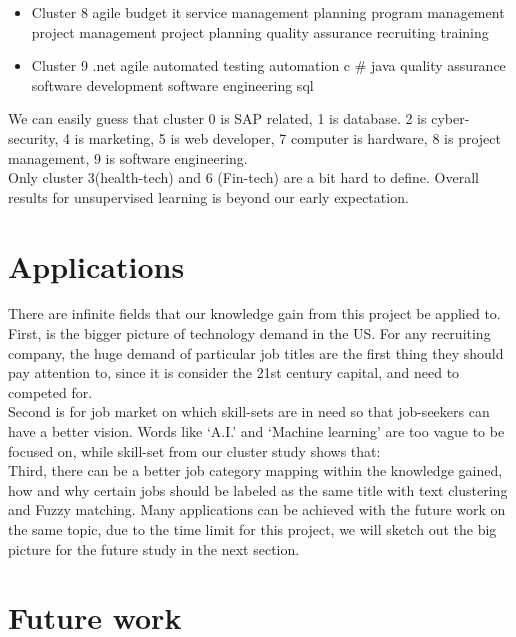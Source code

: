 {\begin{itemize}
							\item Cluster 8
\subitem	agile	
\subitem	budget	
\subitem	it service management	
\subitem	planning	
\subitem	program management	
\subitem	project management	
\subitem	project planning	
\subitem	quality assurance	
\subitem	recruiting	
\subitem	training	
							
								\item Cluster 9
\subitem	.net	
\subitem	agile	
\subitem	automated testing	
\subitem	automation	
\subitem	c $\#$	
\subitem	java	
\subitem	quality assurance	
\subitem	software development	
\subitem	software engineering	
\subitem	sql	
								
								
\end{itemize}

}
We can easily guess that cluster 0 is SAP related, 1 is database. 2 is cyber-security, 4 is marketing, 5 is web developer, 7 computer is hardware, 8 is project management, 9 is software engineering.\\
Only cluster 3(health-tech) and 6 (Fin-tech) are a bit hard to define. Overall results for unsupervised learning is beyond our early expectation.
\section{Applications}
There are infinite fields that our knowledge gain from this project be applied to. First, is the bigger picture of technology demand in  the US. For any recruiting company, the huge demand of particular job titles are the first thing they should pay attention to, since it is consider the 21st century capital, and need to competed for.\\
 Second is for job market on which skill-sets are in need so that job-seekers can have a better vision. Words like `A.I.' and `Machine learning' are too vague to be focused on, while skill-set from our cluster study shows that:\\
Third, there can be a better job category mapping within the knowledge gained, how and why certain jobs should be labeled as the same title with text clustering and Fuzzy matching. 
Many applications can be achieved with the future work on the same topic, due to the time limit for this project, we will sketch out the big picture for the future study in the next section. 
\section{Future work}
